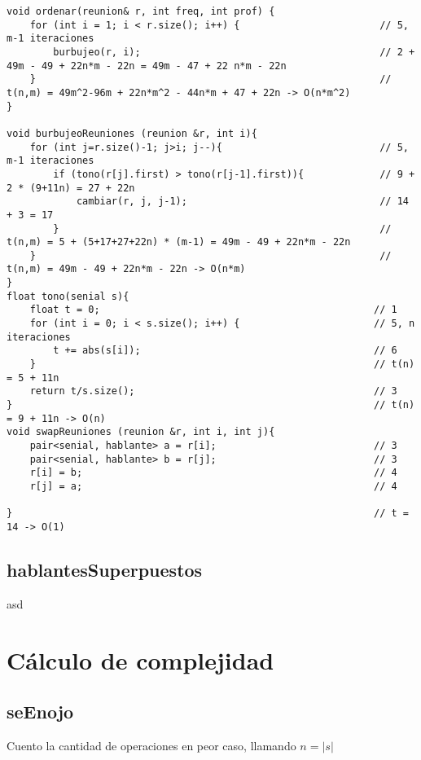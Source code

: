\documentclass{article}
\begin{document}
\begin{lstlisting}
void ordenar(reunion& r, int freq, int prof) {
    for (int i = 1; i < r.size(); i++) {                        // 5, m-1 iteraciones
        burbujeo(r, i);                                         // 2 + 49m - 49 + 22n*m - 22n = 49m - 47 + 22 n*m - 22n
    }                                                           // t(n,m) = 49m^2-96m + 22n*m^2 - 44n*m + 47 + 22n -> O(n*m^2)
}

void burbujeoReuniones (reunion &r, int i){
    for (int j=r.size()-1; j>i; j--){                           // 5, m-1 iteraciones
        if (tono(r[j].first) > tono(r[j-1].first)){             // 9 + 2 * (9+11n) = 27 + 22n
            cambiar(r, j, j-1);                                 // 14 + 3 = 17
        }                                                       // t(n,m) = 5 + (5+17+27+22n) * (m-1) = 49m - 49 + 22n*m - 22n
    }                                                           // t(n,m) = 49m - 49 + 22n*m - 22n -> O(n*m)
}
float tono(senial s){
    float t = 0;                                               // 1
    for (int i = 0; i < s.size(); i++) {                       // 5, n iteraciones
        t += abs(s[i]);                                        // 6
    }                                                          // t(n) = 5 + 11n
    return t/s.size();                                         // 3
}                                                              // t(n) = 9 + 11n -> O(n)
void swapReuniones (reunion &r, int i, int j){
    pair<senial, hablante> a = r[i];                           // 3
    pair<senial, hablante> b = r[j];                           // 3
    r[i] = b;                                                  // 4
    r[j] = a;                                                  // 4

}                                                              // t = 14 -> O(1)
\end{lstlisting}
\subsection{hablantesSuperpuestos}
asd

\newpage
{}
\section*{Cálculo de complejidad}
\vspace{0.5cm}
\subsection{seEnojo}
Cuento la cantidad de operaciones en peor caso, llamando $n=|s|$
\end{document}
